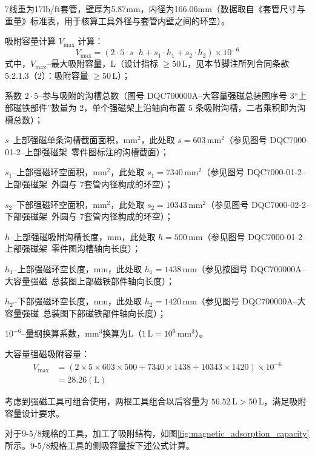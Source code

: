7\inch 线重为17lb/ft套管，壁厚为5.87mm，内径为166.06mm（数据取自《套管尺寸与重量》标准表，用于核算工具外径与套管内壁之间的环空）。

吸附容量计算 $V_{\max}$ 计算：
\begin{equation}
    V_{\max} = (2 \cdot 5 \cdot s \cdot h + s_1 \cdot h_1 + s_2 \cdot h_2) \times 10^{-6}
    \label{eq:mag_tool_adsorption_capacity}
\end{equation}
式中，$V_{\max}$--最大吸附容量，L（设计指标 $\ge 50$\,L，见本节脚注所列合同条款 5.2.1.3（2）：吸附容量 $\ge 50$\,L）；

系数 $2\cdot 5$--参与吸附的沟槽总数（图号 DQC700000A--大容量强磁总装图序号 3“上部磁铁部件”数量为 2，单个强磁架上沿轴向布置 5 条吸附沟槽，二者乘积即为沟槽总数）；

$s$--上部强磁单条沟槽截面面积，$\text{mm}^2$，此处取 $s = 603\,\text{mm}^2$（参见图号 DQC7000-01-2--上部强磁架\ 零件图标注的沟槽截面）；

$s_1$--上部强磁环空面积，$\text{mm}^2$，此处取 $s_1 = 7340\,\text{mm}^2$（参见图号 DQC7000-01-2--上部强磁架\ 外圆与 7\inch 套管内径构成的环空）；

$s_2$--下部强磁环空面积，$\text{mm}^2$，此处取 $s_2 = 10343\,\text{mm}^2$（参见图号 DQC7000-02-2--下部强磁架\ 外圆与 7\inch 套管内径构成的环空）；

$h$--上部强磁吸附沟槽长度，mm，此处取 $h = 500\,\text{mm}$（参见图号 DQC7000-01-2--上部强磁架\ 零件图沟槽轴向长度）；

$h_1$--上部强磁环空长度，mm，此处取 $h_1 = 1438\,\text{mm}$（参见按图号 DQC700000A--大容量强磁\ 总装图上部磁铁部件轴向长度）；

$h_2$--下部强磁环空长度，mm，此处取 $h_2 = 1420\,\text{mm}$（参见图号 DQC700000A--大容量强磁\ 总装图下部磁铁部件轴向长度）；

$10^{-6}$--量纲换算系数，mm$^3$换算为L（$1\,\text{L} = 10^6\,\text{mm}^3$）。

大容量强磁吸附容量：
\begin{equation}
	\begin{aligned}
    V_{\max} &= (2 \times 5 \times 603 \times 500 + 7340 \times 1438 + 10343 \times 1420) \times 10^{-6} \\
             &= 28.26(\text{L})
	\end{aligned}
\end{equation}

考虑到强磁工具可组合使用，两根工具组合以后容量为 $56.52\,\text{L} > 50\,\text{L}$，满足吸附容量设计要求。

对于9-5/8\inch 规格的工具，加工了吸附结构，如图\ref{fig:magnetic_adsorption_capacity}所示。9-5/8\inch 规格工具的侧吸容量按下述公式计算。

